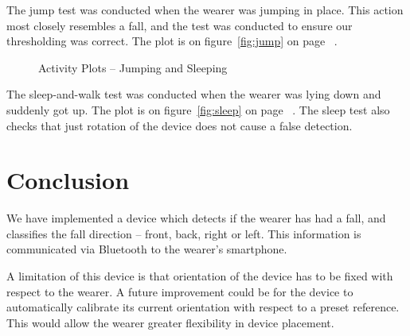 \documentclass[11pt, a4paper]{article}
\begin{document}
\noindent The jump test was conducted when the wearer was jumping in place. This
action most closely resembles a fall, and the test was conducted to ensure our
thresholding was correct. The plot is on figure~\ref{fig:jump} on page
~\pageref{fig:jump}.
\begin{figure}[!ht]
   \caption{Activity Plots -- Jumping and Sleeping}
\end{figure}

\noindent The sleep-and-walk test was conducted when the wearer was lying down and suddenly
got up. The plot is on figure~\ref{fig:sleep} on page
~\pageref{fig:sleep}. The sleep test also checks that just rotation of the
device does not cause a false detection.

\section{Conclusion}
We have implemented a device which detects if the wearer has had a fall, and
classifies the fall direction -- front, back, right or left. This information
is communicated via Bluetooth to the wearer's smartphone.

\noindent A limitation of this device is that orientation of the device has
to be fixed with respect to the wearer.  A future improvement could be for the
device to automatically calibrate its current orientation with respect to a
preset reference. This would allow the wearer greater flexibility in device
placement.



\end{document}
